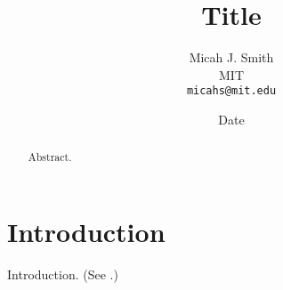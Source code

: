 \documentclass[conference]{article}
\author{
    Micah J. Smith\\
    MIT\\
    \texttt{micahs@mit.edu}
}
\date{Date}
\title{Title}
\begin{document}
\maketitle

\begin{abstract}
    Abstract.
\end{abstract}

\section{Introduction}

Introduction. (See \cite{whitehead1912principia}.)



\end{document}

